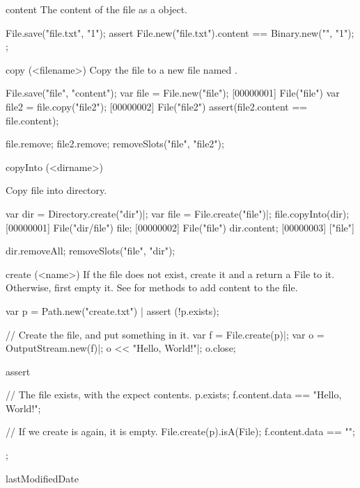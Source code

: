 \begin{urbiscriptapi}
\item[content]
  The content of the file as a  object.
\begin{urbiscript}
File.save("file.txt", "1\n");
assert
{
  File.new("file.txt").content == Binary.new("", "1\n");
};
\end{urbiscript}


\item[copy](<filename>)
  Copy the file to a new file named .
\begin{urbiscript}
File.save("file", "content");
var file = File.new("file");
[00000001] File("file")
var file2 = file.copy("file2");
[00000002] File("file2")
assert(file2.content == file.content);
\end{urbiscript}
\begin{urbicomment}
file.remove;
file2.remove;
removeSlots("file", "file2");
\end{urbicomment}


\item[copyInto](<dirname>)
  \experimental{}

  Copy file into  directory.
\begin{urbiscript}
var dir = Directory.create("dir")|;
var file = File.create("file")|;
file.copyInto(dir);
[00000001] File("dir/file")
file;
[00000002] File("file")
dir.content;
[00000003] ["file"]
\end{urbiscript}
\begin{urbicomment}
dir.removeAll;
removeSlots("file", "dir");
\end{urbicomment}


\item[create](<name>)%
  If the file  does not exist, create it and a return a File to
  it.  Otherwise, first empty it.  See  for methods
  to add content to the file.
\begin{urbiscript}
var p = Path.new("create.txt") |
assert (!p.exists);

// Create the file, and put something in it.
var f = File.create(p)|;
var o = OutputStream.new(f)|;
o << "Hello, World!"|;
o.close;

assert
{
  // The file exists, with the expect contents.
  p.exists;
  f.content.data == "Hello, World!";

  // If we create is again, it is empty.
  File.create(p).isA(File);
  f.content.data == "";
};
\end{urbiscript}


\item[lastModifiedDate]
  \experimental{}


\end{urbiscriptapi}
